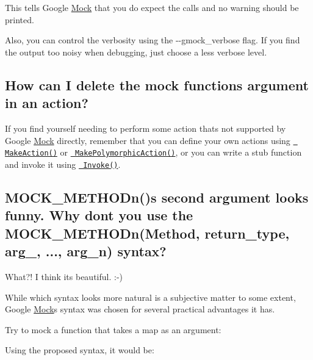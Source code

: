 This tells Google \mbox{\hyperlink{class_mock}{Mock}} that you do expect the calls and no warning should be printed.

Also, you can control the verbosity using the {\ttfamily -\/-\/gmock\+\_\+verbose} flag. If you find the output too noisy when debugging, just choose a less verbose level.

\subsection*{How can I delete the mock function\textquotesingle{}s argument in an action?}

If you find yourself needing to perform some action that\textquotesingle{}s not supported by Google \mbox{\hyperlink{class_mock}{Mock}} directly, remember that you can define your own actions using \href{CookBook.md\#writing-new-actions-quickly}{\texttt{ Make\+Action()}} or \href{CookBook.md\#writing-new-polymorphic-actions}{\texttt{ Make\+Polymorphic\+Action()}}, or you can write a stub function and invoke it using \href{CookBook.md\#using-functionsmethodsfunctors-as-actions}{\texttt{ Invoke()}}.

\subsection*{M\+O\+C\+K\+\_\+\+M\+E\+T\+H\+O\+Dn()\textquotesingle{}s second argument looks funny. Why don\textquotesingle{}t you use the M\+O\+C\+K\+\_\+\+M\+E\+T\+H\+O\+Dn(\+Method, return\+\_\+type, arg\+\_, ..., arg\+\_\+n) syntax?}

What?! I think it\textquotesingle{}s beautiful. \+:-\/)

While which syntax looks more natural is a subjective matter to some extent, Google \mbox{\hyperlink{class_mock}{Mock}}\textquotesingle{}s syntax was chosen for several practical advantages it has.

Try to mock a function that takes a map as an argument\+: 
\begin{DoxyCode}{0}
\end{DoxyCode}


Using the proposed syntax, it would be\+: 
\begin{DoxyCode}{0}
\end{DoxyCode}


